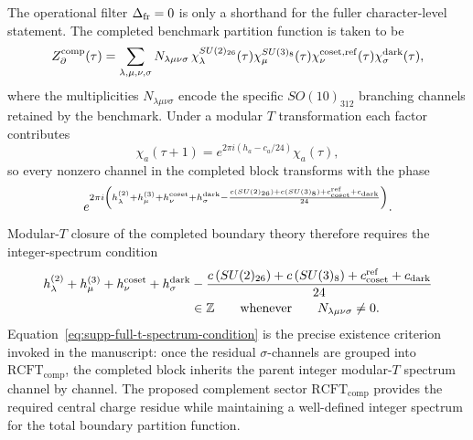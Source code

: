 \documentclass[11pt]{article}
\begin{document}
The operational filter $\Delta_{\rm fr}=0$ is only a shorthand for the fuller
character-level statement. The completed benchmark partition function is taken
to be
\begin{equation}
 Z_{\partial}^{\rm comp}(\tau)
 =
 \sum_{\lambda,\mu,\nu,\sigma}
 N_{\lambda\mu\nu\sigma}\,
 \chi_{\lambda}^{SU(2)_{26}}(\tau)
 \chi_{\mu}^{SU(3)_8}(\tau)
 \chi_{\nu}^{\rm coset,ref}(\tau)
 \chi_{\sigma}^{\rm dark}(\tau),
\end{equation}
where the multiplicities $N_{\lambda\mu\nu\sigma}$ encode the specific
$SO(10)_{312}$ branching channels retained by the benchmark. Under a modular
$T$ transformation each factor contributes
\begin{equation}
 \chi_a(\tau+1)=e^{2\pi i(h_a-c_a/24)}\chi_a(\tau),
\end{equation}
so every nonzero channel in the completed block transforms with the phase
\begin{equation}
 e^{2\pi i\left(h_{\lambda}^{(2)}+h_{\mu}^{(3)}+h_{\nu}^{\rm coset}+h_{\sigma}^{\rm dark}
 -\frac{c\left(SU(2)_{26}\right)+c\left(SU(3)_8\right)+c_{\rm coset}^{\rm ref}+c_{\rm dark}}{24}\right)}.
\end{equation}
Modular-$T$ closure of the completed boundary theory therefore requires the
integer-spectrum condition
\begin{equation}
\begin{aligned}
 h_{\lambda}^{(2)}+h_{\mu}^{(3)}+h_{\nu}^{\rm coset}+h_{\sigma}^{\rm dark}
 &-\frac{c\left(SU(2)_{26}\right)+c\left(SU(3)_8\right)+c_{\rm coset}^{\rm ref}+c_{\rm dark}}{24} \\
 &\in\mathbb Z
 \qquad\text{whenever}\qquad
 N_{\lambda\mu\nu\sigma}\neq0.
\end{aligned}
\label{eq:supp-full-t-spectrum-condition}
\end{equation}
Equation~\eqref{eq:supp-full-t-spectrum-condition} is the precise existence criterion invoked in the manuscript: once the residual $\sigma$-channels are grouped into $\mathrm{RCFT}_{\mathrm{comp}}$, the completed block inherits the parent integer modular-$T$ spectrum channel by channel. The proposed complement sector $\mathrm{RCFT}_{\mathrm{comp}}$ provides the required central charge residue while maintaining a well-defined integer spectrum for the total boundary partition function.
\end{document}
